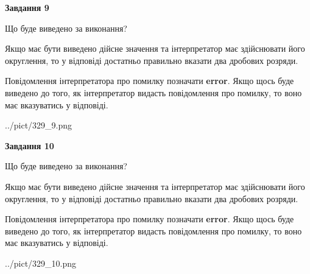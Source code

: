\documentclass[12pt, ukrainian]{article}
\begin{document}
{\begin {Large}
{\begin {center}\textbf{Завдання 9}\end {center}}\par
Що буде виведено за виконання? \par

Якщо має бути виведено дійсне значення та інтерпретатор має здійснювати його округлення, 
то у відповіді достатньо правильно вказати два дробових розряди.

Повідомлення інтерпретатора про помилку позначати \textbf{error}.
Якщо щось буде виведено до того, як інтерпретатор видасть повідомлення про помилку, 
то воно має вказуватись у відповіді. \par

\begin{center}
	{../pict/329_9.png}
\end{center}
\newpage

{\begin {center}\textbf{Завдання 10}\end {center}}\par
Що буде виведено за виконання? \par

Якщо має бути виведено дійсне значення та інтерпретатор має здійснювати його округлення, 
то у відповіді достатньо правильно вказати два дробових розряди.

Повідомлення інтерпретатора про помилку позначати \textbf{error}.
Якщо щось буде виведено до того, як інтерпретатор видасть повідомлення про помилку, 
то воно має вказуватись у відповіді. \par

\begin{center}
	{../pict/329_10.png}
\end{center}
\newpage

\end {Large}}
\end{document}
